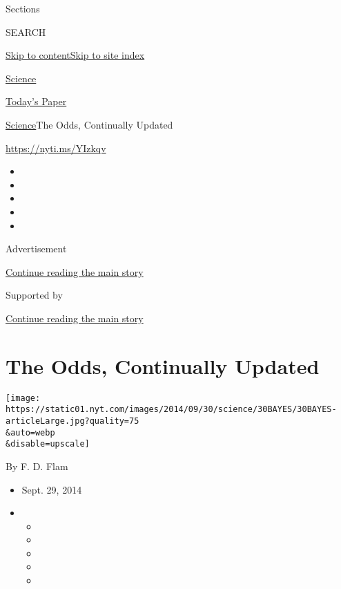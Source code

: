 Sections

SEARCH

\protect\hyperlink{site-content}{Skip to
content}\protect\hyperlink{site-index}{Skip to site index}

\href{https://www.nytimes.com/section/science}{Science}

\href{https://myaccount.nytimes.com/auth/login?response_type=cookie\&client_id=vi}{}

\href{https://www.nytimes.com/section/todayspaper}{Today's Paper}

\href{/section/science}{Science}\textbar{}The Odds, Continually Updated

\url{https://nyti.ms/YIzkqv}

\begin{itemize}
\item
\item
\item
\item
\item
\end{itemize}

Advertisement

\protect\hyperlink{after-top}{Continue reading the main story}

Supported by

\protect\hyperlink{after-sponsor}{Continue reading the main story}

\hypertarget{the-odds-continually-updated}{%
\section{The Odds, Continually
Updated}\label{the-odds-continually-updated}}

\texttt{[image: https://static01.nyt.com/images/2014/09/30/science/30BAYES/30BAYES-articleLarge.jpg?quality=75\\\&auto=webp\\\&disable=upscale]}

By F. D. Flam

\begin{itemize}
\item
  Sept. 29, 2014
\item
  \begin{itemize}
  \item
  \item
  \item
  \item
  \item
  \end{itemize}
\end{itemize}

